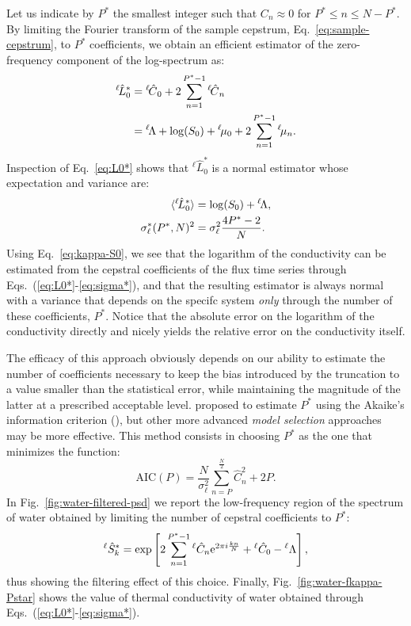 Let us indicate by $P^*$ the smallest integer such that $C_n \approx 0$ for $P^* \le n \le N-P^*$. By limiting the Fourier transform of the sample cepstrum, Eq.~\eqref{eq:sample-cepstrum}, to $P^*$ coefficients, we obtain an efficient estimator of the zero-frequency component of the log-spectrum as:
\begin{equation}
  \begin{aligned}
    ^{{\ell\!}}\hat{L}_{0}^{*} & = {^{\ell\!}\hat{C}}_{0}+2\sum_{n=1}^{P^{*}-1}{^{{\ell\!}}\hat{C}}_{n} \\
    & = {^{\ell\!}\rLambda} + \log(S_0) + {^{{\ell\!}} {\mu}_{0}}+ 2 \sum_{n=1}^{P^*-1} {^{\ell\!} {\mu}_{n}}.
  \end{aligned} \label{eq:L0*}
\end{equation}
Inspection of Eq.~\eqref{eq:L0*} shows that $^{\ell\!}\hat{L}_{0}^{*}$ is a normal estimator whose expectation and variance are:
\begin{align}
	\langle {^{{\ell\!}}\hat{L}_{0}^{*}}\rangle &= \log(S_{0}) + {^{\ell\!}\rLambda}, \label{eq:L*} \\
	\sigma_\ell^{*}(P^{*},N)^{2} &=\sigma_{\ell}^{2}\frac{4P^{*}-2}{N}. \label{eq:sigma*}
\end{align}
Using Eq.~\eqref{eq:kappa-S0}, we see that the logarithm of the conductivity can be estimated from the cepstral coefficients of the flux time series through Eqs.~(\ref{eq:L0*}-\ref{eq:sigma*}), and that the resulting estimator is always normal with a variance that depends on the specifc system \emph{only} through the number of these coefficients, $P^*$. Notice that the absolute error on the logarithm of the conductivity directly and nicely yields the relative error on the conductivity itself.

The efficacy of this approach obviously depends on our ability to estimate the number of coefficients necessary to keep the bias introduced by the truncation to a value smaller than the statistical error, while maintaining the magnitude of the latter at a prescribed acceptable level. \cite{Ercole2017} proposed to estimate $P^*$ using the Akaike's information criterion (\cite{Akaike1974}), but other more advanced \emph{model selection} approaches \citep{Claeskens2008} may be more effective. This method consists in choosing $P^*$ as the one that minimizes the function:
\begin{equation}
\mathrm{AIC}(P)=\frac{N}{\sigma_\ell^{2}}\sum_{n=P}^\frac{N}{2} \hat{C}_{n}^{2}+2P. \label{eq:AIC-P}
\end{equation}
In Fig.~\ref{fig:water-filtered-psd} we report the low-frequency region of the spectrum of water obtained by limiting the number of cepstral coefficients to $P^*$:
\begin{equation}
^\ell\hat{S}_k^* = \exp\left[ 2\sum_{n=1}^{P^*-1} {}^\ell\hat{C}_n \mathrm{e}^{2\pi i \frac{k n}{N}} + {}^\ell\hat{C}_0 - {}^\ell\rLambda\right], \label{eq:filtered-psd}
\end{equation}
thus showing the filtering effect of this choice.
Finally, Fig.~\ref{fig:water-fkappa-Pstar} shows the value of thermal conductivity of water obtained through Eqs.~(\ref{eq:L0*}-\ref{eq:sigma*}).

